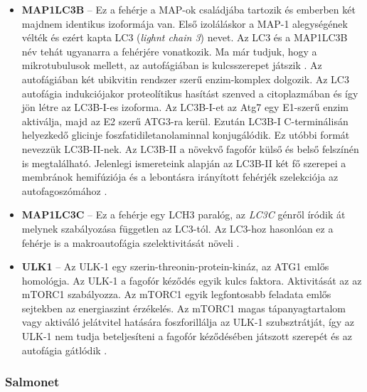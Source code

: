 \documentclass[a4paper,12pt]{article}
\begin{document}
\begin{itemize}
					\item \textbf{MAP1LC3B} -- Ez a fehérje a MAP-ok családjába tartozik és emberben két majdnem identikus izoformája van. Első izoláláskor a MAP-1 alegységének vélték és ezért kapta LC3 (\textit{lighnt chain 3}) nevet. Az LC3 és a MAP1LC3B név tehát ugyanarra a fehérjére vonatkozik. Ma már tudjuk, hogy a mikrotubulusok mellett, az autofágiában is kulcsszerepet játszik \cite{atg8_like}.  Az autofágiában két ubikvitin rendszer szerű enzim-komplex dolgozik. Az LC3 autofágia indukciójakor proteolítikus hasítást szenved a citoplazmában és így jön létre az LC3B-I-es izoforma. Az LC3B-I-et az Atg7 egy E1-szerű enzim aktiválja, majd az E2 szerű ATG3-ra kerül. Ezután LC3B-I C-terminálisán helyezkedő glicinje foszfatidiletanolaminnal konjugálódik. Ez utóbbi formát nevezzük LC3B-II-nek. Az LC3B-II a növekvő fagofór külső és belső felszínén is megtalálható. Jelenlegi ismereteink alapján az LC3B-II két fő szerepei a membránok hemifúziója és a lebontásra irányított fehérjék szelekciója az autofagoszómához \cite{autophagy_proteins}.

					\item \textbf{MAP1LC3C} -- Ez a fehérje egy LCH3 paralóg, az \textit{LC3C} génről íródik át melynek szabályozása független az LC3-tól. Az LC3-hoz hasonlóan ez a fehérje is a makroautofágia szelektivitását növeli \cite{atg8_like}.

					\item \textbf{ULK1} -- Az ULK-1 egy szerin-threonin-protein-kináz, az ATG1 emlős homológja. Az ULK-1 a fagofór kéződés egyik kulcs faktora. Aktivitását az az mTORC1 szabályozza. Az mTORC1 egyik legfontosabb feladata emlős sejtekben az energiaszint érzékelés. Az mTORC1 magas tápanyagtartalom vagy aktiváló jelátvitel hatására foszforillálja az ULK-1 szubsztrátját, így az ULK-1 nem tudja beteljesíteni a fagofór kéződésében játszott szerepét és az autofágia gátlódik \cite{autophagy_proteins}.
				\end{itemize}


		\subsubsection{Salmonet}
\end{document}
